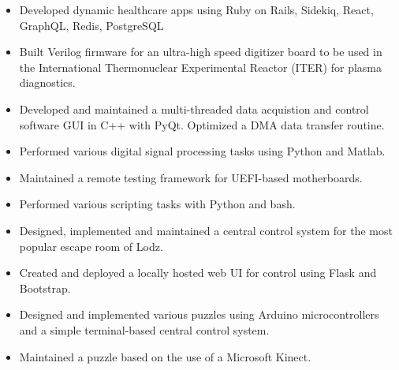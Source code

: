 \documentclass[10pt,a4paper,ragged2e,withhyper]{altacv}
\begin{document}
\begin{paracol}{2}

\begin{itemize}
  \item{Developed dynamic healthcare apps using Ruby on Rails, Sidekiq, React, GraphQL, Redis, PostgreSQL}
\end{itemize}

\divider

\begin{itemize}
  \item Built Verilog firmware for an ultra-high speed digitizer board to be used in the International Thermonuclear Experimental Reactor (ITER) for plasma diagnostics.
  \item Developed and maintained a multi-threaded data acquistion and control software GUI in C++ with PyQt. Optimized a DMA data transfer routine.
  \item Performed various digital signal processing tasks using Python and Matlab.
\end{itemize}

\divider

\begin{itemize}
  \item Maintained a remote testing framework for UEFI-based motherboards.
  \item Performed various scripting tasks with Python and bash.
\end{itemize}


\begin{itemize}
\item Designed, implemented and maintained a central control system for the most popular escape room of Lodz.
\item Created and deployed a locally hosted web UI for control using Flask and Bootstrap.
\end{itemize}

\divider

\begin{itemize}
\item Designed and implemented various puzzles using Arduino microcontrollers and a simple terminal-based central control system.
\item Maintained a puzzle based on the use of a Microsoft Kinect.
\end{itemize}



\end{paracol}
\end{document}

